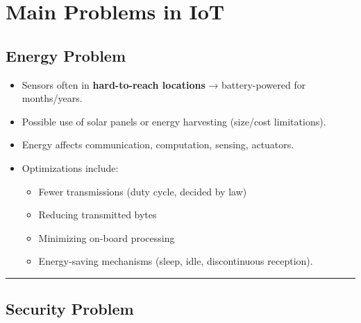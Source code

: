\documentclass[a4paper, 12pt]{book} %
\begin{document}
\chapter{Main Problems in IoT}\label{main-problems-in-iot}

\section{Energy Problem}\label{energy-problem}

\begin{itemize}
\tightlist
\item
  Sensors often in \textbf{hard-to-reach locations} → battery-powered
  for months/years.\\
\item
  Possible use of solar panels or energy harvesting (size/cost
  limitations).
\item
  Energy affects communication, computation, sensing, actuators.
\item
  Optimizations include:

  \begin{itemize}
  \tightlist
  \item
    Fewer transmissions (duty cycle, decided by law)
  \item
    Reducing transmitted bytes
  \item
    Minimizing on-board processing
  \item
    Energy-saving mechanisms (sleep, idle, discontinuous reception).
  \end{itemize}
\end{itemize}

\begin{center}\rule{0.5\linewidth}{0.5pt}\end{center}

\section{Security Problem}\label{security-problem}
\end{document}
